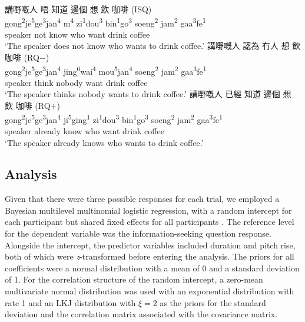 \documentclass[output=paper,colorlinks,citecolor=brown            ,chinesefont]{langscibook}
\begin{document}
\begin{exe}
\let\eachwordone=\cn
\ex\label{3AFC}
\begin{xlist}
\ex\label{3AFC1} \glll 講嘢嘅人 唔 知道 邊個 想 飲 咖啡 (ISQ) \\
gong\textsuperscript{2}je\textsuperscript{5}ge\textsuperscript{3}jan\textsuperscript{4} m\textsuperscript{4} zi\textsuperscript{1}dou\textsuperscript{3} bin\textsuperscript{1}go\textsuperscript{3} soeng\textsuperscript{2} jam\textsuperscript{2} gaa\textsuperscript{3}fe\textsuperscript{1} \\
speaker not know who want drink coffee \\
\trans `The speaker does not know who wants to drink coffee.'
\ex\label{3AFC2} \glll 講嘢嘅人 認為 冇人 想 飲 咖啡 (RQ$-$) \\
gong\textsuperscript{2}je\textsuperscript{5}ge\textsuperscript{3}jan\textsuperscript{4} jing\textsuperscript{6}wai\textsuperscript{4} mou\textsuperscript{5}jan\textsuperscript{4} soeng\textsuperscript{2} jam\textsuperscript{2} gaa\textsuperscript{3}fe\textsuperscript{1} \\
speaker think nobody want drink coffee \\
\trans `The speaker thinks nobody wants to drink coffee.'
\ex\label{3AFC3} \glll 講嘢嘅人 已經 知道 邊個 想 飲 咖啡 (RQ$+$) \\
gong\textsuperscript{2}je\textsuperscript{5}ge\textsuperscript{3}jan\textsuperscript{4} ji\textsuperscript{5}ging\textsuperscript{1} zi\textsuperscript{1}dou\textsuperscript{3} bin\textsuperscript{1}go\textsuperscript{3} soeng\textsuperscript{2} jam\textsuperscript{2} gaa\textsuperscript{3}fe\textsuperscript{1} \\
speaker already know who want drink coffee \\
\trans `The speaker already knows who wants to drink coffee.'
\end{xlist}
\end{exe}

\subsection{Analysis}\label{subsubsec:analysis}

Given that there were three possible responses for each trial, we employed a Bayesian multilevel multinomial logistic regression, with a random intercept for each participant but shared fixed effects for all participants \citep{Koster+2017}. The reference level for the dependent variable was the information-seeking question response. Alongside the intercept, the predictor variables included duration and pitch rise, both of which were \textit{z}-transformed before entering the analysis. The priors for all coefficients were a normal distribution with a mean of 0 and a standard deviation of 1. For the correlation structure of the random intercept, a zero-mean multivariate normal distribution was used with an exponential distribution with rate 1 and an LKJ distribution with $\xi = 2$ as the priors for the standard deviation and the correlation matrix associated with the covariance matrix.
\end{document}
